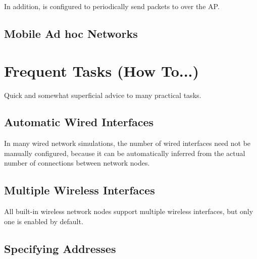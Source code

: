 In addition,  is configured to periodically send
 packets to  over the AP.




\subsection{Mobile Ad hoc Networks}
\label{sec:networks:mobile-ad-hoc-networks}




\section{Frequent Tasks (How To...)}
\label{sec:networks:frequent-tasks}

Quick and somewhat superficial advice to many practical tasks.

\subsection{Automatic Wired Interfaces}
\label{sec:networks:automatic-wired-interfaces}

In many wired network simulations, the number of wired interfaces need not
be manually configured, because it can be automatically inferred from the
actual number of connections between network nodes.


\subsection{Multiple Wireless Interfaces}
\label{sec:networks:multiple-wireless-interfaces}

All built-in wireless network nodes support multiple wireless interfaces,
but only one is enabled by default.


\subsection{Specifying Addresses}
\label{sec:networks:specifying-addresses}

